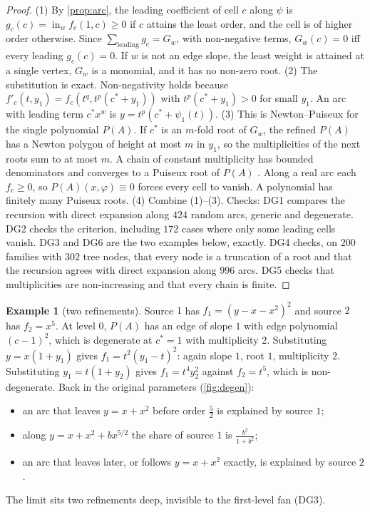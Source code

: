 \documentclass[11pt]{article}
\theoremstyle{definition}\newtheorem{definition}[theorem]{Definition}\newtheorem{remark}[theorem]{Remark}\newtheorem{example}[theorem]{Example}
\begin{document}
\begin{proof}
(1) By \cref{prop:arc}, the leading coefficient of cell $c$ along $\psi$ is $g_c(c)=\operatorname{in}_wf_c(1,c)\ge0$ if $c$ attains the least order, and the cell is
of higher order otherwise. Since $\sum_{\text{leading}}g_c=G_w$, with non-negative terms, $G_w(c)=0$ iff every leading $g_c(c)=0$. If $w$ is not an
edge slope, the least weight is attained at a single vertex, $G_w$ is a monomial, and it has no non-zero root.
(2) The substitution is exact. Non-negativity holds because $f'_c(t,y_1)=f_c(t^q,t^p(c^*+y_1))$ with $t^p(c^*+y_1)>0$ for small $y_1$. An arc with leading
term $c^*x^w$ is $y=t^p(c^*+\psi_1(t))$.
(3) This is Newton--Puiseux for the single polynomial $P(A)$. If $c^*$ is an $m$-fold root of $G_w$, the refined $P(A)$ has a Newton polygon of height
at most $m$ in $y_1$, so the multiplicities of the next roots sum to at most $m$. A chain of constant multiplicity has bounded denominators and
converges to a Puiseux root of $P(A)$ \cite{Walker1950,CasasAlvero2000}. Along a real arc each $f_c\ge0$, so $P(A)(x,\varphi)\equiv0$ forces every cell to vanish.
A polynomial has finitely many Puiseux roots.
(4) Combine (1)--(3).
Checks: DG1 compares the recursion with direct expansion along $424$ random arcs, generic and degenerate. DG2 checks the criterion,
including $172$ cases where only some leading cells vanish. DG3 and DG6 are the two examples below, exactly. DG4 checks, on $200$ families with
$302$ tree nodes, that every node is a truncation of a root and that the recursion agrees with direct expansion along $996$ arcs. DG5 checks
that multiplicities are non-increasing and that every chain is finite.
\end{proof}

\begin{example}[two refinements]\label{ex:twolevel}
Source $1$ has $f_1=(y-x-x^2)^2$ and source $2$ has $f_2=x^5$. At level $0$, $P(A)$ has an edge of slope $1$ with edge polynomial $(c-1)^2$, which is
degenerate at $c^*=1$ with multiplicity $2$. Substituting $y=x(1+y_1)$ gives $f_1=t^2(y_1-t)^2$: again slope $1$, root $1$, multiplicity $2$.
Substituting $y_1=t(1+y_2)$ gives $f_1=t^4y_2^2$ against $f_2=t^5$, which is non-degenerate. Back in the original parameters (\cref{fig:degen}):
\begin{itemize}
\item an arc that leaves $y=x+x^2$ before order $\tfrac52$ is explained by source $1$;
\item along $y=x+x^2+bx^{5/2}$ the share of source $1$ is $\tfrac{b^2}{1+b^2}$;
\item an arc that leaves later, or follows $y=x+x^2$ exactly, is explained by source $2$.
\end{itemize}
The limit sits two refinements deep, invisible to the first-level fan (DG3).
\end{example}
\end{document}
